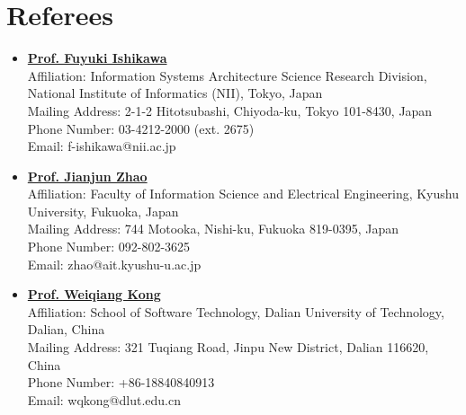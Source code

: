 \documentclass[11pt,a4paper]{moderncv}        %
\begin{document}
\section{Referees}
\begin{itemize}
  \item \textbf{\href{https://researchmap.jp/f-ishikawa}{Prof. Fuyuki Ishikawa}} \\
        Affiliation: Information Systems Architecture Science Research Division, National Institute of Informatics (NII), Tokyo, Japan \\
        Mailing Address: 2-1-2 Hitotsubashi, Chiyoda-ku, Tokyo 101-8430, Japan \\
        Phone Number: 03-4212-2000 (ext. 2675)\\
        Email: f-ishikawa@nii.ac.jp

  \item \textbf{\href{https://researchmap.jp/read0190694}{Prof. Jianjun Zhao}} \\
        Affiliation: Faculty of Information Science and Electrical Engineering, Kyushu University, Fukuoka, Japan \\
        Mailing Address: 744 Motooka, Nishi-ku, Fukuoka 819-0395, Japan\\
        Phone Number: 092-802-3625\\
        Email: zhao@ait.kyushu-u.ac.jp

  \item \textbf{\href{https://faculty.dlut.edu.cn/kongweiqiang/en/index/828473/list/index.htm}{Prof. Weiqiang Kong}} \\
        Affiliation: School of Software Technology, Dalian University of Technology, Dalian, China \\
        Mailing Address: 321 Tuqiang Road, Jinpu New District, Dalian 116620, China\\
        Phone Number: +86-18840840913\\
        Email: wqkong@dlut.edu.cn     
\end{itemize}
\end{document}
